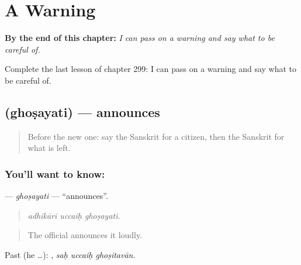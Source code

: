 
\chapter{A Warning}
\label{ch:sa-a-warning}

\begin{chapteropening}
\textbf{By the end of this chapter:} \emph{I can pass on a warning and say what to be careful of.}

Complete the last lesson of chapter 299: I can pass on a warning and say what to be careful of.
\end{chapteropening}

\section[\texorpdfstring{\sk{घोषयति} (ghoṣayati)}{घोषयति (ghoṣayati)}]{ (ghoṣayati) — announces}

\label{lesson:SA-C299-ghosayati}



\begin{quote}
Before the new one: say the Sanskrit for a citizen, then the Sanskrit for what is left.
\end{quote}

\subsection*{You'll want to know: }
\textbf{} — \emph{ghoṣayati} — \textquotedblleft{}announces\textquotedblright{}.

\begin{quote}
  
\end{quote}

\begin{quote}
\emph{adhikārī uccaiḥ ghoṣayati.}
\end{quote}

\begin{quote}
The official announces it loudly.
\end{quote}

Past (he …):   , \emph{saḥ uccaiḥ ghoṣitavān}.

